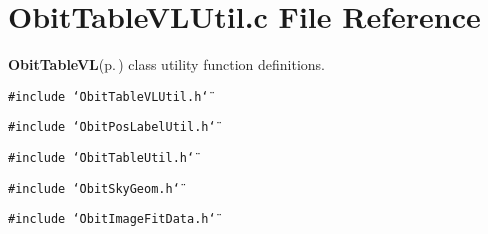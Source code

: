 \section{Obit\-Table\-VLUtil.c File Reference}
\label{ObitTableVLUtil_8c}
{\bf Obit\-Table\-VL}{\rm (p.\,\pageref{structObitTableVL})} class utility function definitions. 

{\tt \#include \char`\"{}Obit\-Table\-VLUtil.h\char`\"{}}\par
{\tt \#include \char`\"{}Obit\-Pos\-Label\-Util.h\char`\"{}}\par
{\tt \#include \char`\"{}Obit\-Table\-Util.h\char`\"{}}\par
{\tt \#include \char`\"{}Obit\-Sky\-Geom.h\char`\"{}}\par
{\tt \#include \char`\"{}Obit\-Image\-Fit\-Data.h\char`\"{}}\par
